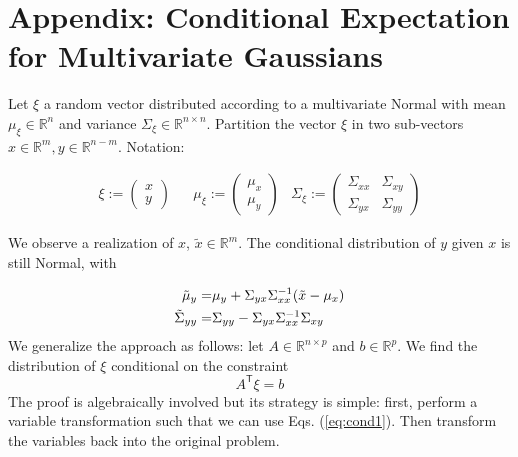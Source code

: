 \documentclass[letter, 12pt]{article}
\newcommand{\transpose}{^\mathsf{T}}
\newcommand{\R}{\mathbb{R}}
\newcommand{\diag}[1]{\text{diag} \left(#1 \right)}
\newcommand{\inv}{^{-1}}
\begin{document}







\section{Appendix: Conditional Expectation for Multivariate Gaussians}

Let $\xi$ a random vector distributed according to a multivariate Normal with mean $\mu_\xi\in\R^n$ and variance $\Sigma_\xi \in\R^{n\times n}$. Partition the vector $\xi$ in two sub-vectors $x\in \R^m, y\in\R^{n-m}$. Notation:

\begin{align*}
\xi:=\left(
\begin{array}{c}
x\\
y
\end{array}
\right) & &
\mu_\xi:=\left(
\begin{array}{c}
\mu_x\\
\mu_y
\end{array}
\right)& 
\Sigma_\xi:=\left(
\begin{array}{cc}
\Sigma_{xx} & \Sigma_{xy}\\
\Sigma_{yx} & \Sigma_{yy}
\end{array}
\right)
\end{align*}

We observe a realization of $x$, $\tilde x\in \R^m$. The conditional distribution of $y$ given $x$ is still Normal, with

%

%

\begin{align}
\tilde\mu_y=&\mu_y + \Sigma_{yx} \Sigma_{xx}\inv(\tilde x-\mu_x) \label{eq:cond1} \\
\tilde\Sigma_{yy}=& \Sigma_{yy} - \Sigma_{yx} \Sigma_{xx}\inv \Sigma_{xy} \notag
\end{align}
%
We generalize the approach as follows: let $A\in\R^{n\times p}$ and $b\in\R^p$. We find the distribution of $\xi$ conditional on the constraint
$$A\transpose \xi = b$$
The proof is algebraically involved but its strategy is simple: first, perform a variable transformation such that we can use Eqs. (\ref{eq:cond1}). Then transform the variables back into the original problem.
\end{document}

